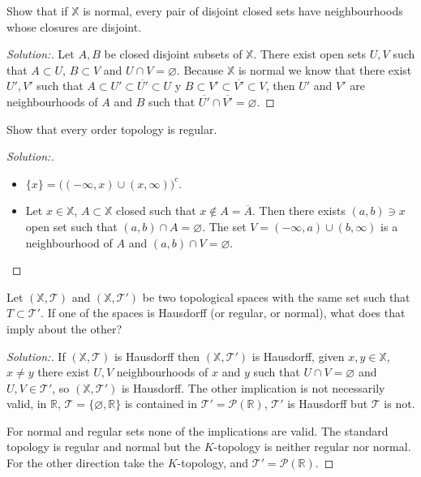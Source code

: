 \documentclass[a4paper,12pt, reqno]{article}
\theoremstyle{definition}
\newenvironment{exerr}[1]{
  \renewcommand\theexeralt{#1}
  \exeralt
}{\endexeralt}
\newenvironment{solution}{\begin{proof}[Solution:]}{\end{proof}}
\newcommand{\R}{\mathbb{R}}
\newcommand{\T}{\mathscr{T}}
\newcommand{\X}{\mathbb{X}}
\newcommand{\Par}{\mathcal{P}}
\begin{document}
\begin{exerr}{2}
  Show that if $\X$ is normal, every pair of disjoint closed sets have neighbourhoods whose closures are disjoint.
\end{exerr}
\begin{solution}
  Let $A,B$ be closed disjoint subsets of $\X$. There exist open sets $U,V$ such that $A\subset U$, $B\subset V$ and $U\cap V = \varnothing$. Because $\X$ is normal we know that there exist $U', V'$ such that $A\subset U'\subset\overline{U'}\subset U$ y $B\subset V'\subset\overline{V'}\subset V$, then $U'$ and $V'$ are neighbourhoods of $A$ and $B$ such that $\overline{U'}\cap\overline{V'} = \varnothing$.
\end{solution}

\begin{exerr}{3}
  Show that every order topology is regular.
\end{exerr}
\begin{solution}\hfill
  \begin{itemize}
    \item $\{ x \}   = \big( (-\infty,x)\cup(x,\infty) \big)^c$.
    \item Let $x\in\X$, $A\subset \X$ closed such that $x\notin A = \overline{A}$. Then there exists $(a,b)\ni x$ open set such that $(a,b)\cap A = \varnothing$. The set $V = (-\infty,a)\cup(b,\infty)$ is a neighbourhood of $A$ and $(a,b)\cap V = \varnothing$.
  \end{itemize}
\end{solution}

\begin{exerr}{4}
  Let $(\X,\T)$ and $(\X,\T')$ be two topological spaces with the same set such that $T\subset\T'$. If one of the spaces is Hausdorff (or regular, or normal), what does that imply about the other?
\end{exerr}
\begin{solution}
  If $(\X,\T)$ is Hausdorff then $(\X,\T')$ is Hausdorff, given $x,y\in\X$, $x\neq y$ there exist $U,V$ neighbourhoods of $x$ and $y$ such that $U\cap V = \varnothing$ and $U, V\in\T'$, so $(\X,\T')$ is Hausdorff. The other implication is not necessarily valid, in $\R$, $\T = \{ \varnothing,\R \}$ is contained in $\T' = \Par(\R)$, $\T'$ is Hausdorff but $\T$ is not.

  For normal and regular sets none of the implications are valid. The standard topology is regular and normal but the $K$-topology is neither regular nor normal. For the other direction take the $K$-topology, and $\T' = \Par(\R)$.
\end{solution}
\end{document}
